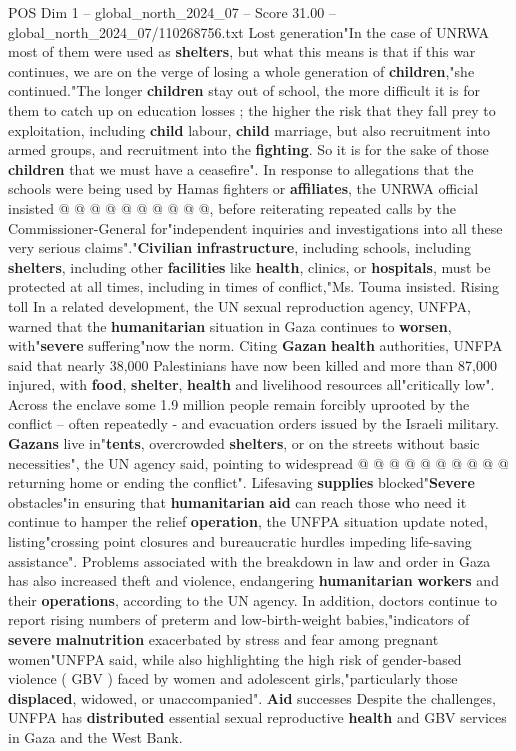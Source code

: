 \begin{textsample}{POS Dim 1 – global\_north\_2024\_07 – Score 31.00 – global\_north\_2024\_07/110268756.txt}
Lost generation"In the case of UNRWA most of them were used as \textbf{shelters}, but what this means is that if this war continues, we are on the verge of losing a whole generation of \textbf{children},"she continued."The longer \textbf{children} stay out of school, the more difficult it is for them to catch up on education losses ; the higher the risk that they fall prey to exploitation, including \textbf{child} labour, \textbf{child} marriage, but also recruitment into armed groups, and recruitment into the \textbf{fighting}.
So it is for the sake of those \textbf{children} that we must have a ceasefire".
In response to allegations that the schools were being used by Hamas fighters or \textbf{affiliates}, the UNRWA official insisted @ @ @ @ @ @ @ @ @ @, before reiterating repeated calls by the Commissioner-General for"independent inquiries and investigations into all these very serious claims"."\textbf{Civilian} \textbf{infrastructure}, including schools, including \textbf{shelters}, including other \textbf{facilities} like \textbf{health}, clinics, or \textbf{hospitals}, must be protected at all times, including in times of conflict,"Ms.
Touma insisted.
Rising toll In a related development, the UN sexual reproduction agency, UNFPA, warned that the \textbf{humanitarian} situation in Gaza continues to \textbf{worsen}, with"\textbf{severe} suffering"now the norm.
Citing \textbf{Gazan} \textbf{health} authorities, UNFPA said that nearly 38,000 Palestinians have now been killed and more than 87,000 injured, with \textbf{food}, \textbf{shelter}, \textbf{health} and livelihood resources all"critically low".
Across the enclave some 1.9 million people remain forcibly uprooted by the conflict -- often repeatedly - and evacuation orders issued by the Israeli military. \textbf{Gazans} live in"\textbf{tents}, overcrowded \textbf{shelters}, or on the streets without basic necessities", the UN agency said, pointing to widespread @ @ @ @ @ @ @ @ @ @ returning home or ending the conflict".
Lifesaving \textbf{supplies} blocked"\textbf{Severe} obstacles"in ensuring that \textbf{humanitarian} \textbf{aid} can reach those who need it continue to hamper the relief \textbf{operation}, the UNFPA situation update noted, listing"crossing point closures and bureaucratic hurdles impeding life-saving assistance".
Problems associated with the breakdown in law and order in Gaza has also increased theft and violence, endangering \textbf{humanitarian} \textbf{workers} and their \textbf{operations}, according to the UN agency.
In addition, doctors continue to report rising numbers of preterm and low-birth-weight babies,"indicators of \textbf{severe} \textbf{malnutrition} exacerbated by stress and fear among pregnant women"UNFPA said, while also highlighting the high risk of gender-based violence ( GBV ) faced by women and adolescent girls,"particularly those \textbf{displaced}, widowed, or unaccompanied". \textbf{Aid} successes Despite the challenges, UNFPA has \textbf{distributed} essential sexual reproductive \textbf{health} and GBV services in Gaza and the West Bank.

\end{textsample}
